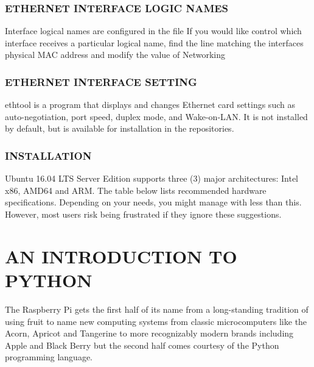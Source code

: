 \subsubsection{ETHERNET INTERFACE LOGIC NAMES}
Interface logical names are configured in the file
If you would like control which interface receives a particular logical name, find the line matching the interfaces
physical MAC address and modify the value of
Networking
\subsubsection{ETHERNET INTERFACE SETTING}
ethtool is a program that displays and changes Ethernet card settings such as auto-negotiation, port speed,
duplex mode, and Wake-on-LAN. It is not installed by default, but is available for installation in the
repositories.
\subsubsection{INSTALLATION}
Ubuntu 16.04 LTS Server Edition supports three (3) major architectures: Intel x86, AMD64 and ARM. The
table below lists recommended hardware specifications. Depending on your needs, you might manage with
less than this. However, most users risk being frustrated if they ignore these suggestions.

\section{AN INTRODUCTION TO PYTHON}
The Raspberry Pi gets the first half of its name from a long-standing tradition of using fruit to name new computing systems from classic microcomputers like the Acorn, Apricot and Tangerine to more recognizably modern brands including Apple and Black Berry but the second half comes courtesy of the Python programming language.

